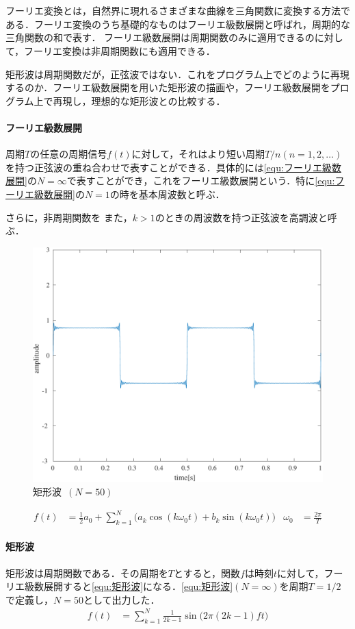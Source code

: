 \section{\kadaiad}\label{sec:\kadaiad}
\purpose
フーリエ変換とは，自然界に現れるさまざまな曲線を三角関数に変換する方法である．フーリエ変換のうち基礎的なものはフーリエ級数展開と呼ばれ，周期的な三角関数の和で表す．
フーリエ級数展開は周期関数のみに適用できるのに対して，フーリエ変換は非周期関数にも適用できる．\cite[p.410]{かたち創造の百科事典}\par
矩形波は周期関数だが，正弦波ではない．これをプログラム上でどのように再現するのか．フーリエ級数展開を用いた矩形波の描画や，フーリエ級数展開をプログラム上で再現し，理想的な矩形波との比較する．
\method
\paragraph{フーリエ級数展開}周期\(T\)の任意の周期信号\(f(t)\)に対して，それはより短い周期\(T/n(n=1,2,\dots)\)を持つ正弦波の重ね合わせで表すことができる．具体的には\eqref{equ:フーリエ級数展開}の\(N=\infty\)で表すことができ，これをフーリエ級数展開という．\cite[p.18\ -\ p.19]{信号処理}特に\eqref{equ:フーリエ級数展開}の\(N=1\)の時を基本周波数と呼ぶ．\par
さらに，非周期関数を
また，\(k>1\)のときの周波数を持つ正弦波を高調波と呼ぶ．

\begin{figure}
    \includegraphics[keepaspectratio,width=.3\textwidth]{../../Figures/01_04_1.pdf}
    \caption{矩形波\ \((N=50)\)}
    \label{fig:矩形波}
\end{figure}
\begin{align}
    f(t) & =\frac{1}{2}a_0 + \sum_{k=1}^{N}\big(a_k\cos(k\omega_0t)+b_k\sin(k\omega_0t)\big) & \omega_0 & =\frac{2\pi}{T}\label{equ:フーリエ級数展開}
\end{align}
\paragraph{矩形波}
矩形波は周期関数である．その周期を\(T\)とすると，関数\(f\)は時刻\(t\)に対して，フーリエ級数展開すると\eqref{equ:矩形波}になる．\eqref{equ:矩形波}\((N=\infty)\)を周期\(T=1/2\)で定義し，\(N=50\)として出力した．
\begin{align}
    f(t) & =\sum_{k=1}^{N}\frac{1}{2k-1}\sin\big(2\pi(2k-1)ft\big)\label{equ:矩形波}
\end{align}
